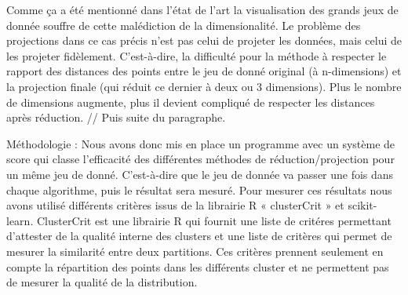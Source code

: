 Comme ça a été mentionné dans l’état de l’art la visualisation des grands jeux de donnée souffre de cette malédiction de la dimensionalité. 
Le problème des projections dans ce cas précis n’est pas celui de projeter les données, mais celui de les projeter fidèlement. 
C’est-à-dire, la difficulté pour la méthode à respecter le rapport des distances des points entre le jeu de donné original (à n-dimensions) et la projection finale (qui réduit ce dernier à deux ou 3 dimensions). 
Plus le nombre de dimensions augmente, plus il devient compliqué de respecter les distances après réduction. // Puis suite du paragraphe.

\medskip

Méthodologie : 
Nous avons donc mis en place un programme avec un système de score qui classe l’efficacité des différentes méthodes de réduction/projection pour un même jeu de donné. 
C’est-à-dire que le jeu de donnée va passer une fois dans chaque algorithme, puis le résultat sera mesuré.
Pour mesurer ces résultats nous avons utilisé différents critères issus de la librairie R « clusterCrit » et scikit-learn.
ClusterCrit est une librairie R qui fournit une liste de critéres permettant d'attester de la qualité interne des clusters et une liste de critères qui permet 
de mesurer la similarité entre deux partitions. Ces critères prennent seulement en compte la répartition des points dans les différents cluster et ne permettent pas de 
mesurer la qualité de la distribution.


